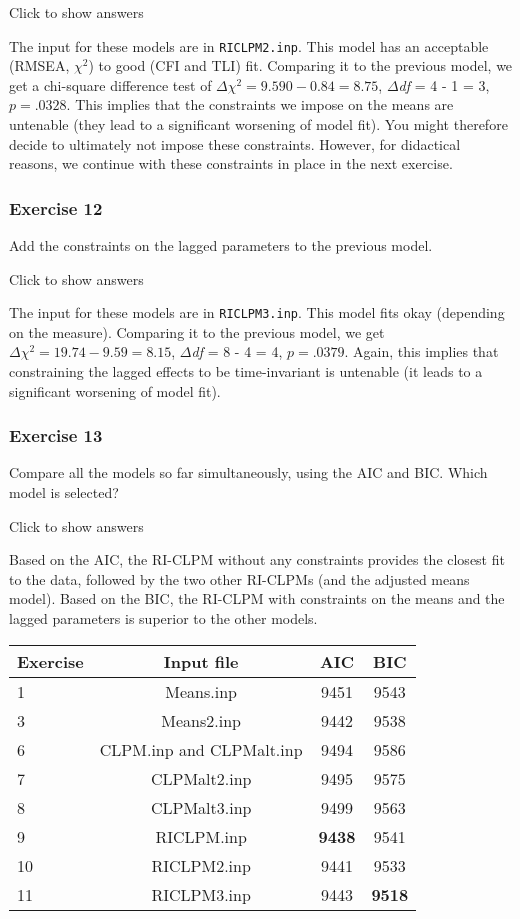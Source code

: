 \documentclass[
]{book}
\begin{document}
Click to show answers

The input for these models are in \texttt{RICLPM2.inp}. This model has an acceptable (RMSEA, \(\chi^{2}\)) to good (CFI and TLI) fit. Comparing it to the previous model, we get a chi-square difference test of \(\Delta\chi^{2} = 9.590 - 0.84 = 8.75\), \(\Delta\)\emph{df} = 4 - 1 = 3, \(p = .0328\). This implies that the constraints we impose on the means are untenable (they lead to a significant worsening of model fit). You might therefore decide to ultimately not impose these constraints. However, for didactical reasons, we continue with these constraints in place in the next exercise.

\hypertarget{exercise-12}{%
\subsubsection*{Exercise 12}\label{exercise-12}}

Add the constraints on the lagged parameters to the previous model.

Click to show answers

The input for these models are in \texttt{RICLPM3.inp}. This model fits okay (depending on the measure). Comparing it to the previous model, we get \(\Delta\chi^{2} = 19.74 - 9.59 = 8.15\), \(\Delta\)\emph{df} = 8 - 4 = 4, \(p = .0379\). Again, this implies that constraining the lagged effects to be time-invariant is untenable (it leads to a significant worsening of model fit).

\hypertarget{exercise-13}{%
\subsubsection*{Exercise 13}\label{exercise-13}}

Compare all the models so far simultaneously, using the AIC and BIC. Which model is selected?

Click to show answers

Based on the AIC, the RI-CLPM without any constraints provides the closest fit to the data, followed by the two other RI-CLPMs (and the adjusted means model). Based on the BIC, the RI-CLPM with constraints on the means and the lagged parameters is superior to the other models.

\begin{longtable}[]{@{}lccc@{}}
\toprule
Exercise & Input file & AIC & BIC \\
\midrule
\endhead
1 & Means.inp & 9451 & 9543 \\
3 & Means2.inp & 9442 & 9538 \\
6 & CLPM.inp and CLPMalt.inp & 9494 & 9586 \\
7 & CLPMalt2.inp & 9495 & 9575 \\
8 & CLPMalt3.inp & 9499 & 9563 \\
9 & RICLPM.inp & \textbf{9438} & 9541 \\
10 & RICLPM2.inp & 9441 & 9533 \\
11 & RICLPM3.inp & 9443 & \textbf{9518} \\
\bottomrule
\end{longtable}
\end{document}
